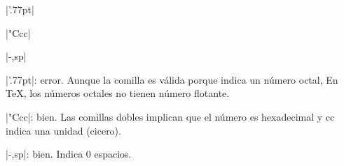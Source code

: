 

\bigskip


|'.77pt|

|"Ccc|

|-,sp|

\bigskip

\respuesta{}

|'.77pt|: error. Aunque la comilla es v\'alida porque indica un
 n\'umero octal, En {\TeX}, los n\'umeros octales no tienen n\'umero
 flotante.

|"Ccc|: bien. Las comillas dobles implican que el n\'umero es
 hexadecimal y cc indica una unidad (cicero).

|-,sp|: bien. Indica 0 espacios.

\bye